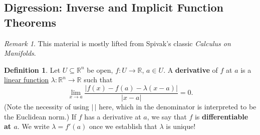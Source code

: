 \documentclass[12pt]{article}
\newcommand{\real}{\mathbb{R}}
\newcommand{\ita}[1]{\textit{#1}}
\theoremstyle{definition}
\newtheorem{definition}[theorem]{Definition}
\theoremstyle{remark}
\newtheorem*{remark}{Remark}
\begin{document}
\subsection{Digression: Inverse and Implicit Function Theorems}
\begin{remark}
    This material is mostly lifted from Spivak's classic \ita{Calculus on Manifolds}. 
\end{remark}
\begin{definition}
    Let $U \subseteq \real^n$ be open, $f : U \to \real$, $a \in U$. A \textbf{derivative} of $f$ at $a$ is a \underline{linear function} $\lambda : \real^n \to \real$ such that 
    \begin{equation}
        \lim\limits_{x \to a} \frac{| f(x) - f(a) - \lambda(x - a) |}{| x - a |} = 0.
    \end{equation}
    (Note the necessity of using $|\,|$ here, which in the denominator is interpreted to be the Euclidean norm.) If $f$ has a derivative at $a$, we say that $f$ is \textbf{differentiable at $a$}. We write $\lambda = f'(a)$ once we establish that $\lambda$ is unique!
\end{definition}
\end{document}
